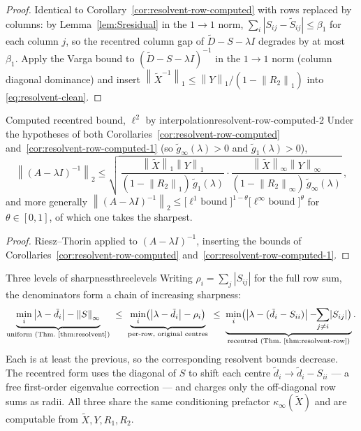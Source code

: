 \documentclass[11pt, a4paper]{article}
\numberwithin{equation}{section}
\newcommand{\norm}[1]{\left\|#1\right\|}
\newcommand{\abs}[1]{\left|#1\right|}
\newcommand{\tX}{\widetilde{X}}
\newcommand{\tD}{\widetilde{D}}
\begin{document}
\begin{proof}
Identical to Corollary~\ref{cor:resolvent-row-computed} with rows replaced by
columns: by Lemma~\ref{lem:Sresidual} in the $1\to 1$ norm, $\sum_i\abs{S_{ij}
- \tilde S_{ij}} \le \beta_1$ for each column $j$, so the recentred column gap
of $\tD - S - \lambda I$ degrades by at most $\beta_1$.  Apply the Varga bound
to $(\tD - S - \lambda I)^{-1}$ in the $1\to 1$ norm (column diagonal
dominance) and insert $\norm{\tX^{-1}}_1 \le \norm{Y}_1/(1 - \norm{R_2}_1)$ into
\eqref{eq:resolvent-clean}.
\end{proof}

\begin{corollary}{Computed recentred bound, $\ell^2$ by interpolation}{resolvent-row-computed-2}
  Under the hypotheses of both Corollaries~\textup{\ref{cor:resolvent-row-computed}}
  and~\textup{\ref{cor:resolvent-row-computed-1}} \textup{(}so $\tilde
  g_\infty(\lambda) > 0$ and $\tilde g_1(\lambda) > 0$\textup{)},
  \[
    \norm{(A - \lambda I)^{-1}}_2
      \le \sqrt{\,\frac{\norm{\tX}_1\norm{Y}_1}{(1-\norm{R_2}_1)\,\tilde g_1(\lambda)}
                 \cdot
                 \frac{\norm{\tX}_\infty\norm{Y}_\infty}{(1-\norm{R_2}_\infty)\,\tilde g_\infty(\lambda)}}\,,
  \]
  and more generally
  $\norm{(A-\lambda I)^{-1}}_2 \le \bigl[\text{$\ell^1$ bound}\bigr]^{1-\theta}
  \bigl[\text{$\ell^\infty$ bound}\bigr]^{\theta}$ for $\theta\in[0,1]$, of which
  one takes the sharpest.
\end{corollary}

\begin{proof}
Riesz--Thorin applied to $(A - \lambda I)^{-1}$, inserting the bounds of
Corollaries~\ref{cor:resolvent-row-computed}
and~\ref{cor:resolvent-row-computed-1}.
\end{proof}

\begin{remark}{Three levels of sharpness}{threelevels}
  Writing $\rho_i = \sum_j\abs{S_{ij}}$ for the full row sum, the denominators
  form a chain of increasing sharpness:
  \[
    \underbrace{\min_i\abs{\lambda - \tilde d_i} - \norm{S}_\infty}_{\text{uniform (Thm.~\ref{thm:resolvent})}}
    \;\le\;
    \underbrace{\min_i\bigl(\abs{\lambda - \tilde d_i} - \rho_i\bigr)}_{\text{per-row, original centres}}
    \;\le\;
    \underbrace{\min_i\bigl(\abs{\lambda - (\tilde d_i - S_{ii})} - \!\!\sum_{j\ne i}\!\abs{S_{ij}}\bigr)}_{\text{recentred (Thm.~\ref{thm:resolvent-row})}}.
  \]
  Each is at least the previous, so the corresponding resolvent bounds decrease.
  The recentred form uses the diagonal of $S$ to shift each centre $\tilde d_i
  \to \tilde d_i - S_{ii}$ --- a free first-order eigenvalue correction --- and
  charges only the off-diagonal row sums as radii.  All three share the same
  conditioning prefactor $\kappa_\infty(\tX)$ and are computable from $\tX, Y,
  R_1, R_2$.
\end{remark}
\end{document}
